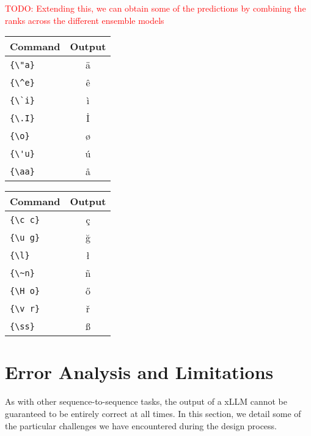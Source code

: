 \documentclass[11pt]{article}
\newcommand{\todo}[1]{\textcolor{red}{TODO: #1}}
\begin{document}
\todo{Extending this, we can obtain some of the predictions by combining the ranks across the different ensemble models}



\begin{table*}
\centering
\begin{tabular}{lc}
\hline
\textbf{Command} & \textbf{Output}\\
\hline
\verb|{\"a}| & {\"a} \\
\verb|{\^e}| & {\^e} \\
\verb|{\`i}| & {\`i} \\ 
\verb|{\.I}| & {\.I} \\ 
\verb|{\o}| & {\o} \\
\verb|{\'u}| & {\'u}  \\ 
\verb|{\aa}| & {\aa}  \\\hline
\end{tabular}
\begin{tabular}{lc}
\hline
\textbf{Command} & \textbf{Output}\\
\hline
\verb|{\c c}| & {\c c} \\ 
\verb|{\u g}| & {\u g} \\ 
\verb|{\l}| & {\l} \\ 
\verb|{\~n}| & {\~n} \\ 
\verb|{\H o}| & {\H o} \\ 
\verb|{\v r}| & {\v r} \\ 
\verb|{\ss}| & {\ss} \\
\hline
\end{tabular}
\caption{Results on the English language test set of the TSAR shared task. Listed are our own results (\emph{UniHD}), the two best-performing competing systems~\todo{include}, as well as provided baselines~\todo{name them and cite the relevant paper}.}
\label{tab:accents}
\end{table*}


\section{Error Analysis and Limitations}

As with other sequence-to-sequence tasks, the output of a xLLM cannot be guaranteed to be entirely correct at all times.
In this section, we detail some of the particular challenges we have encountered during the design process.
\end{document}
